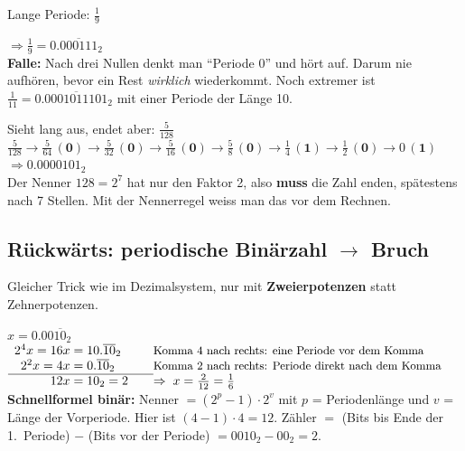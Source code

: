 \begin{beispiel}{Lange Periode: $\tfrac19$}
  \qquad $\Rightarrow \tfrac19 = 0.\overline{000111}_2$\\[4pt]
  \textbf{Falle:} Nach drei Nullen denkt man \enquote{Periode 0} und hört auf. Darum nie
  aufhören, bevor ein Rest \emph{wirklich} wiederkommt. Noch extremer ist
  $\tfrac1{11} = 0.\overline{0001011101}_2$ mit einer Periode der Länge 10.
\end{beispiel}

\begin{beispiel}{Sieht lang aus, endet aber: $\tfrac5{128}$}
  $\tfrac5{128} \to \tfrac5{64}\,(\mathbf0) \to \tfrac5{32}\,(\mathbf0) \to \tfrac5{16}\,(\mathbf0)
   \to \tfrac58\,(\mathbf0) \to \tfrac14\,(\mathbf1) \to \tfrac12\,(\mathbf0) \to 0\,(\mathbf1)$
  \;$\Rightarrow 0.0000101_2$\\[2pt]
  Der Nenner $128 = 2^7$ hat nur den Faktor 2, also \textbf{muss} die Zahl enden,
  spätestens nach 7 Stellen. Mit der Nennerregel weiss man das vor dem Rechnen.
\end{beispiel}

\subsection*{Rückwärts: periodische Binärzahl $\to$ Bruch}
Gleicher Trick wie im Dezimalsystem, nur mit \textbf{Zweierpotenzen} statt Zehnerpotenzen.

\begin{beispiel}{$x = 0.00\overline{10}_2$}
  $\begin{array}{r@{\;=\;}l@{\qquad}l}
    2^4 x = 16x & 10.\overline{10}_2 & \text{\small Komma 4 nach rechts: eine Periode vor dem Komma}\\
    2^2 x = 4x & 0.\overline{10}_2 & \text{\small Komma 2 nach rechts: Periode direkt nach dem Komma}\\ \cline{1-2}
    12x & 10_2 = 2 & \Rightarrow\; x = \frac{2}{12} = \frac16
  \end{array}$\\[4pt]
  \textbf{Schnellformel binär:} Nenner $= (2^{p} - 1) \cdot 2^{v}$ mit $p$ =
  Periodenlänge und $v$ = Länge der Vorperiode. Hier ist $(4 - 1) \cdot 4 = 12$.
  Zähler $=$ (Bits bis Ende der 1.\ Periode) $-$ (Bits vor der Periode)
  $= 0010_2 - 00_2 = 2$.
\end{beispiel}

